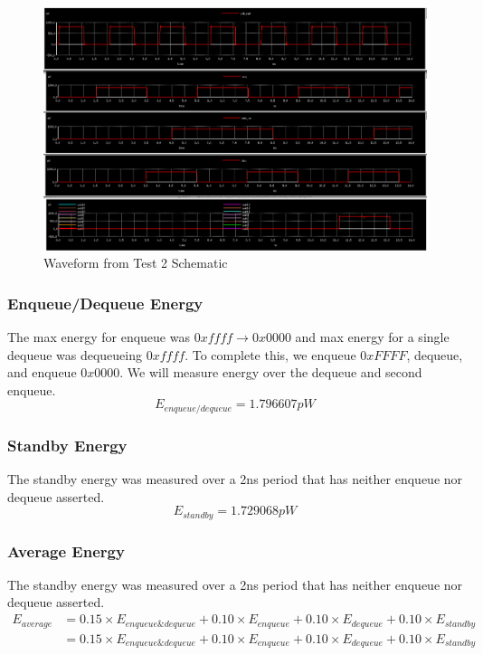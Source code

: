 \documentclass[a4paper]{article}
\begin{document}
\begin{figure}[H]
	\centering
	\includegraphics[scale=0.25]{topLevelTestEnergyWaveform}
	\caption{Waveform from Test 2 Schematic}
	\label{fig:topLevelTestEnergyWaveform}
\end{figure}

\subsubsection{Enqueue/Dequeue Energy}
The max energy for enqueue was $0xffff \rightarrow 0x0000$ and max energy for a single dequeue was dequeueing $0xffff$. To complete this, we enqueue $0xFFFF$, dequeue, and enqueue $0x0000$. We will measure energy over the dequeue and second enqueue.
$$E_{enqueue/dequeue} = 1.796607pW$$

\subsubsection{Standby Energy}
The standby energy was measured over a 2ns period that has neither enqueue nor dequeue asserted.
$$E_{standby} = 1.729068pW$$

\subsubsection{Average Energy}
The standby energy was measured over a 2ns period that has neither enqueue nor dequeue asserted.
\begin{align*}
E_{average} &= 0.15 \times E_{enqueue\&dequeue} + 0.10 \times E_{enqueue} + 0.10 \times E_{dequeue} + 0.10 \times E_{standby}\\
&= 0.15 \times E_{enqueue\&dequeue} + 0.10 \times E_{enqueue} + 0.10 \times E_{dequeue} + 0.10 \times E_{standby}\\
\end{align*}
\end{document}
